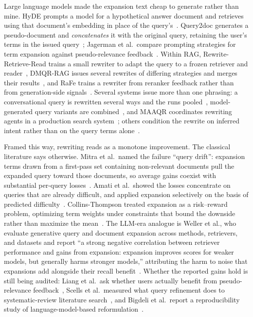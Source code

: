 \documentclass[acmsmall,review,anonymous,screen]{acmart}
\begin{document}
Large language models made the expansion text cheap to generate rather than
mine. HyDE prompts a model for a hypothetical answer document and retrieves
using that document's embedding in place of the query's~\cite{gao2023hyde}.
Query2doc generates a pseudo-document and \emph{concatenates} it with the
original query, retaining the user's terms in the issued
query~\cite{wang2023query2doc}; Jagerman et al.\ compare prompting strategies
for term expansion against pseudo-relevance
feedback~\cite{jagerman2023expansion}. Within RAG,
Rewrite-Retrieve-Read trains a small rewriter to adapt the query to a frozen
retriever and reader~\cite{ma2023rewrite}, DMQR-RAG issues several rewrites of
differing strategies and merges their results~\cite{gao2024dmqr}, and RaFe
trains a rewriter from reranker feedback rather than from generation-side
signals~\cite{ma2023rafe}. Several systems issue more than one phrasing: a conversational query is
rewritten several ways and the runs pooled~\cite{kostric2024multiquery},
model-generated query variants are combined~\cite{ran2025variants}, and MAAQR
coordinates rewriting agents in a production search system~\cite{zheng2025maaqr};
others condition the rewrite on inferred intent rather than on the query terms
alone~\cite{guo2026intent}.

Framed this way, rewriting reads as a monotone improvement. The classical
literature says otherwise. Mitra et al.\ named the failure ``query drift'':
expansion terms drawn from a first-pass set containing non-relevant documents
pull the expanded query toward those documents, so average gains coexist with
substantial per-query losses~\cite{mitra1998expansion}. Amati et al.\ showed the
losses concentrate on queries that are already difficult, and applied expansion
selectively on the basis of predicted difficulty~\cite{amati2004drift}.
Collins-Thompson treated expansion as a risk--reward problem, optimizing term
weights under constraints that bound the downside rather than maximize the
mean~\cite{collinsthompson2009risk}. The LLM-era analogue is Weller et al., who
evaluate generative query and document expansion across methods, retrievers, and
datasets and report ``a strong negative correlation between retriever
performance and gains from expansion: expansion improves scores for weaker
models, but generally harms stronger models,'' attributing the harm to noise
that expansions add alongside their recall
benefit~\cite{weller2024expansions}. Whether the reported gains hold is still
being audited: Liang et al.\ ask whether users actually benefit from
pseudo-relevance feedback~\cite{liang2026drift}, Scells et al.\ measured what
query refinement does to systematic-review literature
search~\cite{scells2022refinement}, and Bigdeli et al.\ report a reproducibility
study of language-model-based reformulation~\cite{bigdeli2026reproducibility}.
\end{document}
